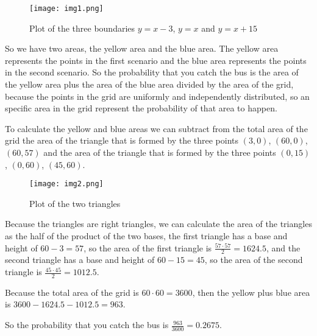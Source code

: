 \singlespacing

\break

\begin{figure}[h]
    \centering
    \texttt{[image: img1.png]}
    \caption{Plot of the three boundaries $y = x - 3$, $y = x$ and $y = x + 15$}
\end{figure}

\singlespacing

So we have two areas, the yellow area and the blue area. The yellow area
represents the points in the first scenario and the blue area represents
the points in the second scenario. So the probability that you catch the
bus is the area of the yellow area plus the area of the blue area divided
by the area of the grid, because the points in the grid are uniformly and
independently distributed, so an specific area in the grid represent the
probability of that area to happen.

\singlespacing

To calculate the yellow and blue areas we can subtract from the total
area of the grid the area of the triangle that is formed by the three
points $(3, 0)$, $(60, 0)$, $(60, 57)$ and the area of the triangle
that is formed by the three points $(0, 15)$, $(0, 60)$, $(45, 60)$.

\singlespacing

\begin{figure}[h]
    \centering
    \texttt{[image: img2.png]}
    \caption{Plot of the two triangles}
\end{figure}

\break

Because the triangles are right triangles, we can calculate the area
of the triangles as the half of the product of the two bases, the first
triangle has a base and height of $60 - 3 = 57$,
so the area of the first triangle is $\frac{57 \cdot 57}{2} = 1624.5$,
and the second triangle has a base and height of $60 - 15 = 45$,
so the area of the second triangle is $\frac{45 \cdot 45}{2} = 1012.5$.

\singlespacing

Because the total area of the grid is $60 \cdot 60 = 3600$, then the
yellow plus blue area is $3600 - 1624.5 - 1012.5 = 963$.

\singlespacing

So the probability that you catch the bus is $\frac{963}{3600} = 0.2675$.